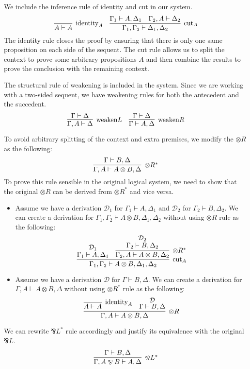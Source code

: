 \documentclass[12pt, openany]{memoir}
\newcommand*{\pare}[0]{\mathbin{\bindnasrepma}}
\begin{document}
We include the inference rule of identity and cut in our system.
\[
  \infer[\text{identity}_A]{A \vdash A}{}
  \quad
  \infer[\text{cut}_A]{\Gamma_1, \Gamma_2 \vdash \Delta_1, \Delta_2}{
    \Gamma_1 \vdash A, \Delta_1
    &
    \Gamma_2, A \vdash \Delta_2
  }
\]
The identity rule closes the proof by ensuring that there is only one same proposition on each side of the sequent.
The cut rule allows us to split the context to prove some arbitrary propositions $A$ and then combine the results to prove the conclusion with the remaining context.

The structural rule of weakening is included in the system. Since we are working with a two-sided sequent, 
we have weakening rules for both the antecedent and the succedent.
\[
  \infer[\text{weaken}L]{
    \Gamma, A \vdash \Delta
  }{
    \Gamma \vdash \Delta
  }
  \quad
  \infer[\text{weaken}R]{
    \Gamma \vdash A, \Delta
  }{
    \Gamma \vdash \Delta
  }
\]

To avoid arbitrary splitting of the context and extra premises, we modify the $\otimes R$ as the following:
\[
  \infer[\otimes R^*]{\Gamma, A \vdash A \otimes B, \Delta}{
    \Gamma \vdash B, \Delta
  }
\]
To prove this rule sensible in the original logical system, we need to show that the original $\otimes R$ can be derived from $\otimes R^*$ and vice versa.
\begin{itemize}
  \item Assume we have a derivation $\mathcal{D}_1$ for $\Gamma_1 \vdash A, \Delta_1$ and $\mathcal{D}_2$ for $\Gamma_2 \vdash B, \Delta_2$.
  We can create a derivation for $\Gamma_1, \Gamma_2 \vdash A \otimes B, \Delta_1, \Delta_2$ without using $\otimes R$ rule as the following:
  \[
    \infer[\text{cut}_A]{\Gamma_1, \Gamma_2 \vdash A \otimes B, \Delta_1, \Delta_2}{
      \deduce{\Gamma_1 \vdash A, \Delta_1}{\mathcal{D}_1}
      &
      \infer[\otimes R^*]{\Gamma_2, A \vdash A \otimes B, \Delta_2}{
        \deduce{\Gamma_2 \vdash B, \Delta_2}{\mathcal{D}_2}
      }
    }
  \]
  \item Assume we have a derivation $\mathcal{D}$ for $\Gamma \vdash B, \Delta$.
  We can create a derivation for $\Gamma, A \vdash A \otimes B, \Delta$ without using $\otimes R^*$ rule as the following:
  \[
    \infer[\otimes R]{\Gamma, A \vdash A \otimes B, \Delta}{
      \infer[\text{identity}_A]{A \vdash A}{}
      &
      \deduce{\Gamma \vdash B, \Delta}{\mathcal{D}}
    }
  \]
\end{itemize}
We can rewrite $\pare L^*$ rule accordingly and justify its equivalence with the original $\pare L$. 
\[
  \infer[\pare L^*]{\Gamma, A \pare B \vdash A, \Delta}{
    \Gamma \vdash B, \Delta
  }
\]
\end{document}
